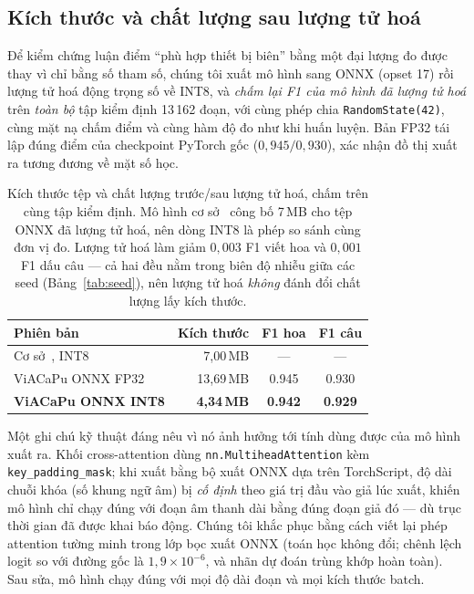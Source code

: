\documentclass[conference,onecolumn]{IEEEtran}
\begin{document}
\subsection{Kích thước và chất lượng sau lượng tử hoá}
\label{sec:onnx}

Để kiểm chứng luận điểm ``phù hợp thiết bị biên'' bằng một đại lượng đo được
thay vì chỉ bằng số tham số, chúng tôi xuất mô hình sang ONNX (opset 17) rồi
lượng tử hoá động trọng số về INT8, và \emph{chấm lại F1 của mô hình đã lượng
tử hoá} trên \emph{toàn bộ} tập kiểm định 13\,162 đoạn, với cùng phép chia
\texttt{RandomState(42)}, cùng mặt nạ chấm điểm và cùng hàm độ đo như khi
huấn luyện. Bản FP32 tái lập đúng điểm của checkpoint PyTorch gốc
($0{,}945/0{,}930$), xác nhận đồ thị xuất ra tương đương về mặt số học.

\begin{table}[htbp]
\caption{Kích thước tệp và chất lượng trước/sau lượng tử hoá, chấm trên cùng
tập kiểm định. Mô hình cơ sở~\cite{you2024lightweight} công bố 7\,MB cho tệp
ONNX đã lượng tử hoá, nên dòng INT8 là phép so sánh cùng đơn vị đo. Lượng tử
hoá làm giảm $0{,}003$ F1 viết hoa và $0{,}001$ F1 dấu câu --- cả hai đều nằm
trong biên độ nhiễu giữa các seed (Bảng~\ref{tab:seed}), nên lượng tử hoá
\emph{không} đánh đổi chất lượng lấy kích thước.}
\label{tab:onnx}
\centering
\setlength{\tabcolsep}{7pt}
\begin{tabular}{lrcc}
\toprule
Phiên bản & Kích thước & F1 hoa & F1 câu \\
\midrule
Cơ sở~\cite{you2024lightweight}, INT8 & 7{,}00\,MB & --- & --- \\
\midrule
ViACaPu ONNX FP32          & 13{,}69\,MB & 0.945 & 0.930 \\
\textbf{ViACaPu ONNX INT8} & \textbf{4{,}34\,MB} & \textbf{0.942} & \textbf{0.929} \\
\bottomrule
\end{tabular}
\end{table}

Một ghi chú kỹ thuật đáng nêu vì nó ảnh hưởng tới tính dùng được của mô hình
xuất ra. Khối cross-attention dùng \texttt{nn.MultiheadAttention} kèm
\texttt{key\_padding\_mask}; khi xuất bằng bộ xuất ONNX dựa trên TorchScript,
độ dài chuỗi khóa (số khung ngữ âm) bị \emph{cố định} theo giá trị đầu vào giả
lúc xuất, khiến mô hình chỉ chạy đúng với đoạn âm thanh dài bằng đúng đoạn giả
đó --- dù trục thời gian đã được khai báo động. Chúng tôi khắc phục bằng cách
viết lại phép attention tường minh trong lớp bọc xuất ONNX (toán học không
đổi; chênh lệch logit so với đường gốc là $1{,}9\times10^{-6}$, và nhãn dự
đoán trùng khớp hoàn toàn). Sau sửa, mô hình chạy đúng với mọi độ dài đoạn và
mọi kích thước batch.
\end{document}
